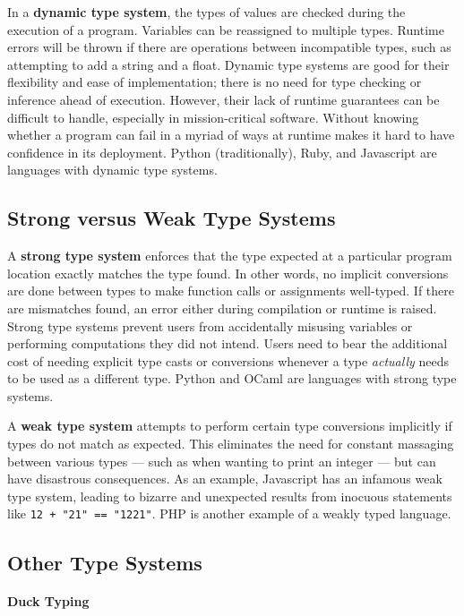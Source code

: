 \documentclass{book}
\begin{document}
In a \textbf{dynamic type system}, the types of values are checked during the execution of a program. Variables can be reassigned to multiple types. Runtime errors will be thrown if there are operations between incompatible types, such as attempting to add a string and a float. Dynamic type systems are good for their flexibility and ease of implementation; there is no need for type checking or inference ahead of execution. However, their lack of runtime guarantees can be difficult to handle, especially in mission-critical software. Without knowing whether a program can fail in a myriad of ways at runtime makes it hard to have confidence in its deployment. Python (traditionally), Ruby, and Javascript are languages with dynamic type systems.

\subsection{Strong versus Weak Type Systems}

A \textbf{strong type system} enforces that the type expected at a particular program location exactly matches the type found. In other words, no implicit conversions are done between types to make function calls or assignments well-typed. If there are mismatches found, an error either during compilation or runtime is raised. Strong type systems prevent users from accidentally misusing variables or performing computations they did not intend. Users need to bear the additional cost of needing explicit type casts or conversions whenever a type \textit{actually} needs to be used as a different type. Python and OCaml are languages with strong type systems.

A \textbf{weak type system} attempts to perform certain type conversions implicitly if types do not match as expected. This eliminates the need for constant massaging between various types --- such as when wanting to print an integer --- but can have disastrous consequences. As an example, Javascript has an infamous weak type system, leading to bizarre and unexpected results from inocuous statements like \texttt{12 + "21" == "1221"}. PHP is another example of a weakly typed language.

\subsection{Other Type Systems}
\paragraph{Duck Typing}
\end{document}
